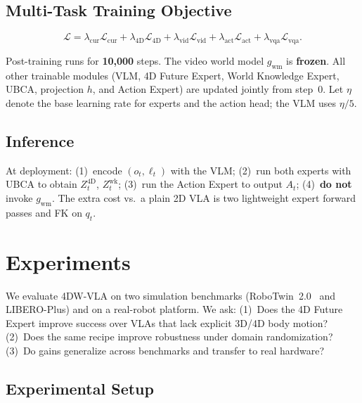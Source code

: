 \documentclass[journal]{IEEEtran}
\begin{document}
\subsection{Multi-Task Training Objective}
\label{sec:training}

\begin{equation}
\mathcal{L} = \lambda_{\mathrm{cur}}\mathcal{L}_{\mathrm{cur}}
    + \lambda_{\mathrm{4D}}\mathcal{L}_{\mathrm{4D}}
    + \lambda_{\mathrm{vid}}\mathcal{L}_{\mathrm{vid}}
    + \lambda_{\mathrm{act}}\mathcal{L}_{\mathrm{act}}
    + \lambda_{\mathrm{vqa}}\mathcal{L}_{\mathrm{vqa}}.
\label{eq:losstotal}
\end{equation}

Post-training runs for \textbf{10{,}000} steps. The video world model
$g_{\mathrm{wm}}$ is \textbf{frozen}. All other trainable modules (VLM,
4D Future Expert, World Knowledge Expert, UBCA, projection $h$, and
Action Expert) are updated jointly from step~0. Let $\eta$ denote the
base learning rate for experts and the action head; the VLM uses
$\eta/5$.

\subsection{Inference}
\label{sec:inference}

At deployment: (1)~encode $(o_t, \ell_t)$ with the VLM; (2)~run both
experts with UBCA to obtain $Z^{\mathrm{4D}}_t$, $Z^{\mathrm{wk}}_t$;
(3)~run the Action Expert to output $A_t$; (4)~\textbf{do not} invoke
$g_{\mathrm{wm}}$. The extra cost vs.\ a plain 2D VLA is two lightweight
expert forward passes and FK on $q_t$.

\section{Experiments}
\label{sec:experiments}

We evaluate 4DW-VLA on two simulation benchmarks
(RoboTwin~2.0~\cite{chen2025robotwin2} and LIBERO-Plus) and on a
real-robot platform. We ask: (1)~Does the 4D Future Expert improve
success over VLAs that lack explicit 3D/4D body motion?
(2)~Does the same recipe improve robustness under domain randomization?
(3)~Do gains generalize across benchmarks and transfer to real hardware?

\subsection{Experimental Setup}
\end{document}
